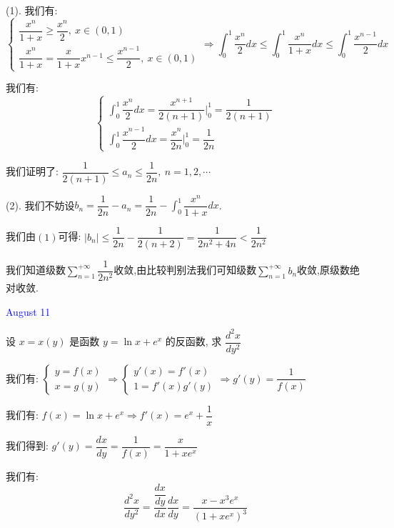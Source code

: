 \begin{solution}

	(1). 我们有:  $$\left\lbrace
	\begin{array}{l}
		\dfrac{x^n}{1+x}\geq \dfrac{x^n}{2},\ x\in(0,1)\\
		\dfrac{x^n}{1+x}=\dfrac{x}{1+x}x^{n-1}\leq\dfrac{x^{n-1}}{2},\ x\in(0,1)
	\end{array}
	\right. \Rightarrow \int_{0}^{1}\dfrac{x^n}{2}dx\leq \int_{0}^{1}\dfrac{x^n}{1+x}dx\leq \int_{0}^{1}\dfrac{x^{n-1}}{2}dx$$
	
	我们有:  $$\left\lbrace
	\begin{array}{l}
		\int_{0}^{1}\dfrac{x^n}{2}dx=\dfrac{x^{n+1}}{2(n+1)}|_{0}^{1}=\dfrac{1}{2(n+1)}\\
		\int_{0}^{1}\dfrac{x^{n-1}}{2}dx=\dfrac{x^{n}}{2n}|_{0}^{1}=\dfrac{1}{2n}
	\end{array}
	\right. $$
	
	我们证明了:  $\dfrac{1}{2(n+1)}\leq a_{n}\leq \dfrac{1}{2n},\ n=1,2,\cdots$
	
	(2). 我们不妨设$b_{n}=\dfrac{1}{2n}-a_{n}=\dfrac{1}{2n}-\int_{0}^{1}\dfrac{x^n}{1+x}dx$.
	
	我们由$(1)$可得:  $|b_{n}|\leq \dfrac{1}{2n}-\dfrac{1}{2(n+2)}=\dfrac{1}{2n^2+4n}<\dfrac{1}{2n^2}$
	
	我们知道级数$\sum\limits_{n=1}^{+\infty}\dfrac{1}{2n^2}$收敛,由比较判别法我们可知级数$\sum\limits_{n=1}^{+\infty}b_{n}$收敛,原级数绝对收敛.
\end{solution}


\textcolor{blue}{August 11}

\begin{example}[][Exam: 34.2.7]
	设 $x=x(y)$ 是函数 $y=\ln x+e^x$ 的反函数, 求 $\dfrac{d^2x}{dy^2}$
\end{example}

\begin{solution}

	我们有:  $\left\lbrace
	\begin{array}{l}
		y=f(x)\\
		x=g(y)
	\end{array}
	\right. \Rightarrow \left\lbrace
	\begin{array}{l}
		y'(x)=f'(x)\\
		1=f'(x)g'(y)
	\end{array}
	\right. \Rightarrow g'(y)=\dfrac{1}{f(x)}$
	
	我们有:  $f(x)=\ln x+e^x\Rightarrow f'(x)=e^x+\dfrac{1}{x}$
	
	我们得到:  $g'(y)=\dfrac{dx}{dy}=\dfrac{1}{f(x)}=\dfrac{x}{1+xe^x}$
	
	我们有:  
	$$\dfrac{d^2x}{dy^2}=\dfrac{\dfrac{dx}{dy}}{dx}\dfrac{dx}{dy}=\dfrac{x-x^3e^x}{(1+xe^x)^3}$$
\end{solution}

